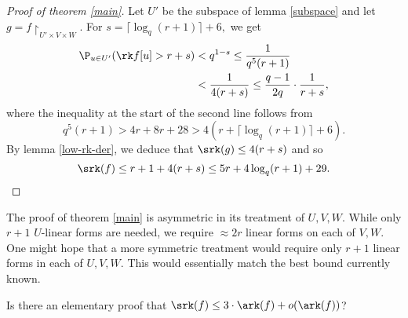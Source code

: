     \begin{proof}[Proof of theorem \ref{main}]
    Let $U'$ be the subspace of lemma \ref{subspace} and let \linebreak $g = f\restriction_{U'\times V\times W}.$ For $s = \lceil\log_q (r+1)\rceil+6,$ we get 
    \begin{align*}
        \P_{u\in U'} (\rk f[u] > r+s) &< q^{1-s} \le \frac{1}{q^5(r+1)}  \\
        &< \frac{1}{4(r+s)} \le \frac{q-1}{2q}\cdot \frac{1}{r+s},
    \end{align*}
    where the inequality at the start of the second line follows from 
    \[
    q^5(r+1) > 4r+8r+28 > 4(r+\lceil\log_q (r+1)\rceil+6).
    \]
    By lemma \ref{low-rk-der}, we deduce that $\srk(g) \le 4(r+s) $ and so
    \[
    \srk(f) \le r+1+4(r+s) \le 5r+4\log_q(r+1)+29.
    \]
    \end{proof}

    The proof of theorem \ref{main} is asymmetric in its treatment of $U,V,W.$ While only $r+1$ $U$-linear forms are needed, we require $\approx 2r$ linear forms on each of $V,W.$ One might hope that a more symmetric treatment would require only $r+1$ linear forms in each of $U,V,W.$ This would essentially match the best bound currently known.

    \begin{question}
        Is there an elementary proof that $\srk(f) \le 3\cdot \ark(f)+o(\ark(f))$? 
    \end{question}



